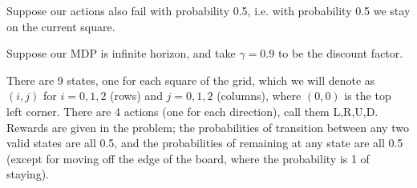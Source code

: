 \documentclass[12pt]{article}
\begin{document}
Suppose our actions also fail with probability 0.5, i.e. with probability 0.5 we stay on the current square.

Suppose our MDP is infinite horizon, and take $\gamma = 0.9$ to be the discount factor.

\vspace{.5pc}

\noindent {}

\vspace{.5pc}

\begin{solution}
There are 9 states, one for each square of the grid, which we will denote as $(i,j)$ for $i=0,1,2$ (rows) and $j=0,1,2$ (columns), where $(0,0)$ is the top left corner. There are 4 actions (one for each direction), call them L,R,U,D. Rewards are given in the problem; the probabilities of transition between any two valid states are all 0.5, and the probabilities of remaining at any state are all 0.5 (except for moving off the edge of the board, where the probability is 1 of staying).
\end{solution}
\vspace{10cm}

\vspace{.5pc}
\noindent {}

\vspace{.5pc}
\end{document}
